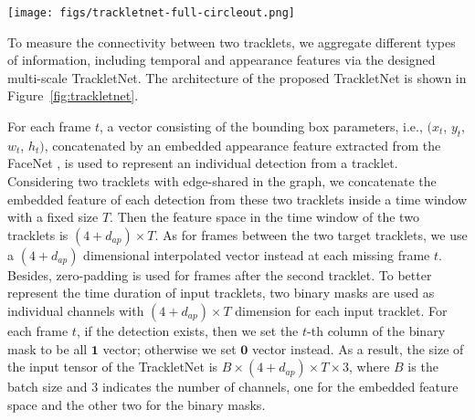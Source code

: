 \documentclass[10pt,twocolumn,letterpaper]{article}
\begin{document}
\begin{figure*}
\begin{center}
\texttt{[image: figs/trackletnet-full-circleout.png]}
\end{center}
   \caption{Architecture of Multi-scale TrackletNet. 
   First, we extract embedded features from two input tracklets, which include $4D$ location features and $512D$ appearance features along the time window of $64$ frames.
   The input tensor has three channels, i.e., one for tracklet embedded features and the other two for binary masks, where white color represents 1 and black color represents 0. Four types of $1D$ convolution kernels are applied for feature extraction in three convolution layers. 
For each convolution layer, max pooling is adopted for down-sampling in the time domain. Average pooling is conducted on the dimensions of the appearance feature after \texttt{Conv3}. Then two fully connected layers are conducted to get the final output. 
}
\label{fig:trackletnet}
\end{figure*}



To measure the connectivity between two tracklets,
we aggregate different types of information, including temporal and appearance features via the designed multi-scale TrackletNet. 
The architecture of the proposed TrackletNet is shown in Figure~\ref{fig:trackletnet}.

For each frame $t$, a vector consisting of the bounding box parameters, i.e., $(x_t$, $y_t$, $w_t$, $h_t)$, concatenated by an embedded appearance feature extracted from the FaceNet \cite{schroff2015facenet}, is used to represent an individual detection from a tracklet. Considering two tracklets with edge-shared in the graph, we concatenate the embedded feature of each detection from these two tracklets inside a time window with a fixed size $T$. Then the feature space in the time window of the two tracklets is $(4+d_{ap}) \times T$. As for frames between the two target tracklets, we use a $(4+d_{ap})$ dimensional interpolated vector instead at each missing frame $t$. Besides, zero-padding is used for frames after the second tracklet. 
To better represent the time duration of input tracklets, two binary masks are used as individual channels with $(4+d_{ap}) \times T$ dimension for each input tracklet. For each frame $t$, if the detection exists, then we set the $t$-th column of the binary mask to be all $\mathbf{1}$ vector; otherwise we set $\mathbf{0}$ vector instead. 
As a result, the size of the input tensor of the TrackletNet is $B \times (4+d_{ap}) \times T \times 3$, where $B$ is the batch size and $3$ indicates the number of channels, one for the embedded feature space and the other two for the binary masks. 
\end{document}
